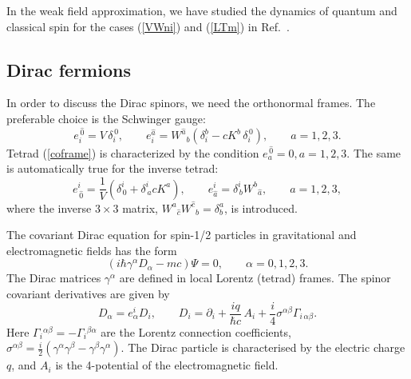 \documentclass[preprint,showpacs,preprintnumbers,eqsecnum,amsmath,amssymb]{revtex4}
\begin{document}
In the weak field approximation, we have studied the dynamics of
quantum and classical spin for the cases (\ref{VWni}) and
(\ref{LTm}) in Ref.~\cite{OST}.


\subsection{Dirac fermions}


In order to discuss the Dirac spinors, we need the orthonormal
frames. The preferable choice \cite{OST} is the Schwinger gauge:
\begin{equation}\label{coframe}
e_i^{\,\widehat{0}} = V\,\delta^{\,0}_i,\qquad e_i^{\widehat{a}} =
W^{\widehat a}{}_b\left(\delta^b_i - cK^b\,\delta^{\,0}_i\right),\qquad a=1,2,3.
\end{equation}
Tetrad (\ref{coframe}) is characterized by the condition
$e_a^{\,\widehat{0}} =0, a=1,2,3$. The same is automatically true
for the inverse tetrad:
\begin{equation}\label{frame}
e_{\,\widehat{0}}^i = {\frac 1V}\left(\delta_{\,0}^i +
\delta_{\,a}^icK^a\right), \qquad e^i_{\widehat{a}} =
\delta_{\,b}^iW^b{}_{\widehat a},\qquad a=1,2,3,
\end{equation}
where the inverse $3\times 3$ matrix, $W^a{}_{\widehat
c}W^{\widehat c}{}_b = \delta_b^a$, is introduced.

The covariant Dirac equation for spin-1/2 particles in
gravitational and electromagnetic fields has the form
\begin{equation}
(i\hbar\gamma^\alpha D_\alpha - mc)\Psi=0,\qquad \alpha=0,1,2,3.
\label{Dirac0}
\end{equation}
The Dirac matrices $\gamma^\alpha$ are defined in local Lorentz
(tetrad) frames. The spinor covariant derivatives are given by
\begin{equation}
D_\alpha = e_\alpha^i D_i,\qquad D_i = \partial _i + {\frac {iq}{\hbar c}} 
\,A_i + {\frac i4}\sigma^{\alpha\beta}\Gamma_{i\,\alpha\beta}.\label{eqin2}
\end{equation}
Here $\Gamma_i{}^{\alpha\beta} = - \Gamma_i{}^{\beta\alpha}$ are
the Lorentz connection coefficients, $\sigma^{\alpha\beta} = \frac
i2\left(\gamma^\alpha \gamma^\beta
-\gamma^\beta\gamma^\alpha\right)$. The Dirac particle is
characterised by the electric charge $q$, and $A_i$ is the
4-potential of the electromagnetic field.
\end{document}
